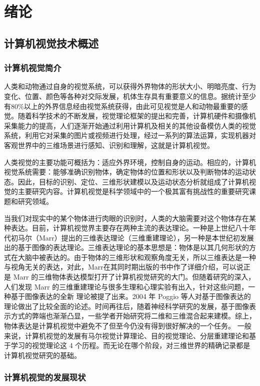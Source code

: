
\chapter{绪论}
\section{计算机视觉技术概述}
\subsection{计算机视觉简介}
人类和动物通过自身的视觉系统，可以获得外界物体的形状大小、明暗亮度、行为变化、位置、颜色等各种对交际发展，机体生存具有重要意义的信息。据统计至少有80\%以上的外界信息经由视觉系统获得，由此可见视觉是人和动物最重要的感觉。随着科学技术的不断发展，视觉理论框架的提出和完善，计算机硬件和摄像机采集能力的提高，人们逐渐开始通过利用计算机及相关的其他设备模仿人类的视觉系统，利用它对采集的图片或视频进行处理，经过一系列的算法运算，实现机器对客观世界中的三维场景进行感知、识别和理解，这就是计算机视觉。

人类视觉的主要功能可概括为：适应外界环境，控制自身的运动。相应的，计算机视觉系统需要：能够准确识别物体，确定物体的位置和形状以及判断物体的运动状态。因此，目标的识别、定位、三维形状建模以及运动状态分析就组成了计算机视觉的主要研究内容。计算机视觉是科学领域中的一个极其富有挑战性的重要研究课题和研究领域。

当我们对现实中的某个物体进行肉眼的识别时，人类的大脑需要对这个物体存在某种表达。目前，计算机视觉界主要存在两种主流的表达理论。一种是上世纪八十年代初马尔（Marr）提出的三维表达理论（三维重建理论），另一种是本世纪初发展出的基于图像的表达理论。三维表达理论的基本思想是：物体是以其几何形状的方式在大脑中被表达的。由于物体的三维形状和观察角度无关，所以三维表达是一种与视角无关的表达，对此，Marr在其同时期出版的书中作了详细介绍，可以说正是 Marr 的三维物体表达模型打开了计算机视觉研究的大门。但随着研究的深入，人们发现 Marr  的三维重建理论与很多生理和心理实验有出入，针对这些问题，一种基于图像表达的全新
理论被提了出来。2004 年 Poggio  等人对基于图像表达的理论做出了比较全面的论述。时间再往后，随着神经科学研究的发展，基于图像表示方式的弊端也渐渐凸显，一些学者开始研究将二维和三维混合起来建模。综上，物体表达是计算机视觉中避免不了但至今仍没有得到很好解决的一个任务。 一般来说，计算机视觉的发展有马尔视觉计算理论、目的视觉理论、分层重建理论和基于学习的视觉理论这 4 个历程。而无论在哪个阶段，对三维世界的精确记录都是计算机视觉研究的基础。

\subsection{计算机视觉的发展现状}

